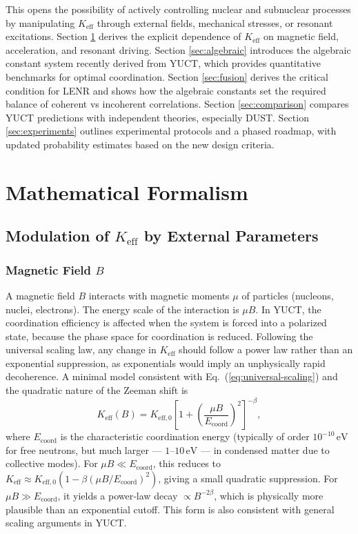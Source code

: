 \documentclass[12pt]{article}
\theoremstyle{remark}
\newcommand{\Keff}{K_{\mathrm{eff}}}
\newcommand{\Keffzero}{K_{\mathrm{eff},0}}
\begin{document}
	This opens the possibility of actively controlling nuclear and subnuclear processes by manipulating \(\Keff\) through external fields, mechanical stresses, or resonant excitations. Section \ref{sec:math} derives the explicit dependence of \(\Keff\) on magnetic field, acceleration, and resonant driving. Section \ref{sec:algebraic} introduces the algebraic constant system recently derived from YUCT, which provides quantitative benchmarks for optimal coordination. Section \ref{sec:fusion} derives the critical condition for LENR and shows how the algebraic constants set the required balance of coherent vs incoherent correlations. Section \ref{sec:comparison} compares YUCT predictions with independent theories, especially DUST. Section \ref{sec:experiments} outlines experimental protocols and a phased roadmap, with updated probability estimates based on the new design criteria.
	
	\section{Mathematical Formalism}
	\label{sec:math}
	
	\subsection{Modulation of \(\Keff\) by External Parameters}
	
	\subsubsection{Magnetic Field \(B\)}
	
	A magnetic field \(B\) interacts with magnetic moments \(\mu\) of particles (nucleons, nuclei, electrons). The energy scale of the interaction is \(\mu B\). In YUCT, the coordination efficiency is affected when the system is forced into a polarized state, because the phase space for coordination is reduced. Following the universal scaling law, any change in \(\Keff\) should follow a power law rather than an exponential suppression, as exponentials would imply an unphysically rapid decoherence. A minimal model consistent with Eq.~(\ref{eq:universal-scaling}) and the quadratic nature of the Zeeman shift is
	\begin{equation}
		\Keff(B) = \Keffzero \left[ 1 + \left( \frac{\mu B}{E_{\mathrm{coord}}} \right)^2 \right]^{-\beta},
		\label{eq:keff-B}
	\end{equation}
	where \(E_{\mathrm{coord}}\) is the characteristic coordination energy (typically of order \(10^{-10}\,\text{eV}\) for free neutrons, but much larger — \(1\)–\(10\,\text{eV}\) — in condensed matter due to collective modes). For \(\mu B \ll E_{\mathrm{coord}}\), this reduces to \(\Keff \approx \Keffzero (1 - \beta (\mu B/E_{\mathrm{coord}})^2)\), giving a small quadratic suppression. For \(\mu B \gg E_{\mathrm{coord}}\), it yields a power‑law decay \(\propto B^{-2\beta}\), which is physically more plausible than an exponential cutoff. This form is also consistent with general scaling arguments in YUCT.
	
\end{document}
